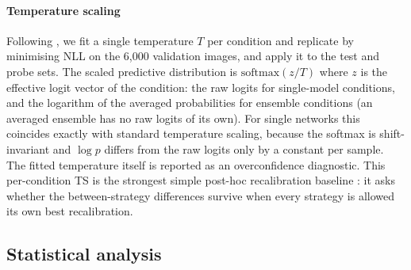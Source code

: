 \documentclass[11pt,a4paper]{article}
\newcommand{\ts}{\textsc{TS}}
\begin{document}
\paragraph{Temperature scaling}
Following \citet{guo2017}, we fit a single temperature $T$ per condition
and replicate by minimising NLL on the 6{,}000 validation images, and apply
it to the test and probe sets. The scaled predictive distribution is
$\mathrm{softmax}(z/T)$ where $z$ is the effective logit vector of the
condition: the raw logits for single-model conditions, and the logarithm of
the averaged probabilities for ensemble conditions (an averaged ensemble
has no raw logits of its own). For single networks this coincides exactly
with standard temperature scaling, because the softmax is shift-invariant
and $\log p$ differs from the raw logits only by a constant per sample.
The fitted temperature itself is reported as an overconfidence diagnostic.
This per-condition \ts{} is the strongest simple post-hoc recalibration
baseline \citep{guo2017,zhang2020}: it asks whether the between-strategy
differences survive when every strategy is allowed its own best
recalibration.

\subsection{Statistical analysis}\label{sec:stats}
\end{document}
